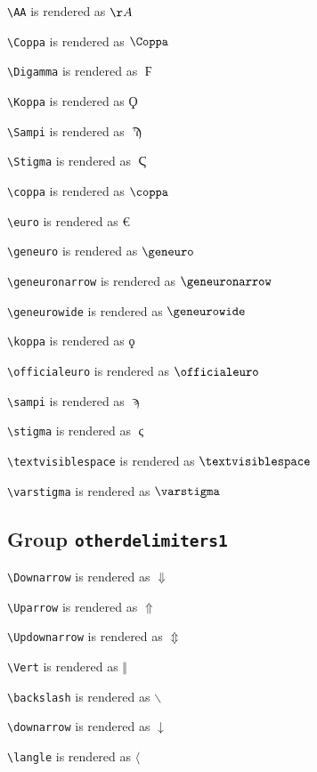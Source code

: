 \texttt{\textbackslash AA} is rendered as $\AA$

\texttt{\textbackslash Coppa} is rendered as $\Coppa$

\texttt{\textbackslash Digamma} is rendered as $\Digamma$

\texttt{\textbackslash Koppa} is rendered as $\Koppa$

\texttt{\textbackslash Sampi} is rendered as $\Sampi$

\texttt{\textbackslash Stigma} is rendered as $\Stigma$

\texttt{\textbackslash coppa} is rendered as $\coppa$

\texttt{\textbackslash euro} is rendered as $\euro$

\texttt{\textbackslash geneuro} is rendered as $\geneuro$

\texttt{\textbackslash geneuronarrow} is rendered as $\geneuronarrow$

\texttt{\textbackslash geneurowide} is rendered as $\geneurowide$

\texttt{\textbackslash koppa} is rendered as $\koppa$

\texttt{\textbackslash officialeuro} is rendered as $\officialeuro$

\texttt{\textbackslash sampi} is rendered as $\sampi$

\texttt{\textbackslash stigma} is rendered as $\stigma$

\texttt{\textbackslash textvisiblespace} is rendered as $\textvisiblespace$

\texttt{\textbackslash varstigma} is rendered as $\varstigma$

\subsection{ Group \texttt{other\textunderscore delimiters1}}

\texttt{\textbackslash Downarrow} is rendered as $\Downarrow$

\texttt{\textbackslash Uparrow} is rendered as $\Uparrow$

\texttt{\textbackslash Updownarrow} is rendered as $\Updownarrow$

\texttt{\textbackslash Vert} is rendered as $\Vert$

\texttt{\textbackslash backslash} is rendered as $\backslash$

\texttt{\textbackslash downarrow} is rendered as $\downarrow$

\texttt{\textbackslash langle} is rendered as $\langle$

